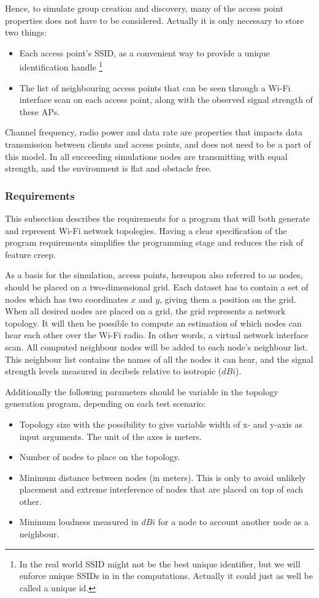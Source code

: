 Hence, to simulate group creation and discovery, many of the access point properties does not have to be considered. Actually it is only necessary to store two things:
\begin{itemize}
	\item Each access point's SSID, as a convenient way to provide a unique identification handle \footnote{In the real world SSID might not be the best unique identifier,
but we will enforce unique SSIDs in in the computations. Actually it could just as well be called a unique id.}
	\item The list of neighbouring access points that can be seen through a Wi-Fi interface scan on each access point, along with the observed signal strength of these APs.
\end{itemize}
Channel frequency, radio power and data rate are properties that impacts data transmission between clients and access points, and does not need to be a 
part of this model. 
In all succeeding simulations nodes are transmitting with equal strength, and the environment is flat and obstacle free. 


\subsubsection{Requirements}
This subsection describes the requirements for a program that will both generate and represent Wi-Fi network topologies. Having a clear specification of the program requirements
simplifies the programming stage and reduces the risk of feature creep. 

As a basis for the simulation, access points, hereupon also referred to as nodes, should be placed on a two-dimensional grid. Each dataset has to contain a set of nodes which has two coordinates $x$ and $y$, giving them a position on the grid. When all desired nodes are placed on a grid, the grid represents a network topology. It will then be possible to compute an
estimation of which nodes can hear each other over the Wi-Fi radio. In other words, a virtual network interface scan. All computed neighbour nodes will be added to each node's
neighbour list. This neighbour list contains the names of all the nodes it can hear, and the signal strength levels measured in decibels relative to isotropic ($dBi$).

Additionally the following parameters should be variable in the topology generation program, depending on each test scenario:

\begin{itemize}
	\item Topology size with the possibility to give variable width of x- and y-axis as input arguments. The unit of the axes is meters. 
	\item Number of nodes to place on the topology.
	\item Minimum distance between nodes (in meters). This is only to avoid unlikely placement and extreme interference of nodes that are placed on top of each other. 
	\item Minimum loudness measured in $dBi$ for a node to account another node as a neighbour.
\end{itemize}


